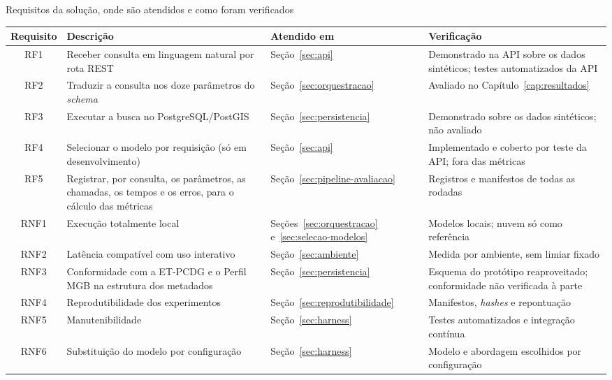 \begin{quadro}[htbp!]
\centering
\caption{Requisitos da solução, onde são atendidos e como foram verificados}
\label{quadro:requisitos-resumo}
\footnotesize
\begin{tabular}{|c|>{\raggedright\arraybackslash}p{4.7cm}|>{\raggedright\arraybackslash}p{2.6cm}|>{\raggedright\arraybackslash}p{5.2cm}|}
\hline
\textbf{Requisito} & \textbf{Descrição} & \textbf{Atendido em} & \textbf{Verificação} \\
\hline
RF1 & Receber consulta em linguagem natural por rota REST & Seção~\ref{sec:api} & Demonstrado na API sobre os dados sintéticos; testes automatizados da API \\
\hline
RF2 & Traduzir a consulta nos doze parâmetros do \textit{schema} & Seção~\ref{sec:orquestracao} & Avaliado no Capítulo~\ref{cap:resultados} \\
\hline
RF3 & Executar a busca no PostgreSQL/PostGIS & Seção~\ref{sec:persistencia} & Demonstrado sobre os dados sintéticos; não avaliado \\
\hline
RF4 & Selecionar o modelo por requisição (só em desenvolvimento) & Seção~\ref{sec:api} & Implementado e coberto por teste da API; fora das métricas \\
\hline
RF5 & Registrar, por consulta, os parâmetros, as chamadas, os tempos e os erros, para o cálculo das métricas & Seção~\ref{sec:pipeline-avaliacao} & Registros e manifestos de todas as rodadas \\
\hline
RNF1 & Execução totalmente local & Seções~\ref{sec:orquestracao} e~\ref{sec:selecao-modelos} & Modelos locais; nuvem só como referência \\
\hline
RNF2 & Latência compatível com uso interativo & Seção~\ref{sec:ambiente} & Medida por ambiente, sem limiar fixado \\
\hline
RNF3 & Conformidade com a ET-PCDG e o Perfil MGB na estrutura dos metadados & Seção~\ref{sec:persistencia} & Esquema do protótipo reaproveitado; conformidade não verificada à parte \\
\hline
RNF4 & Reprodutibilidade dos experimentos & Seção~\ref{sec:reprodutibilidade} & Manifestos, \textit{hashes} e repontuação \\
\hline
RNF5 & Manutenibilidade & Seção~\ref{sec:harness} & Testes automatizados e integração contínua \\
\hline
RNF6 & Substituição do modelo por configuração & Seção~\ref{sec:harness} & Modelo e abordagem escolhidos por configuração \\
\hline
\end{tabular}%
\end{quadro}

